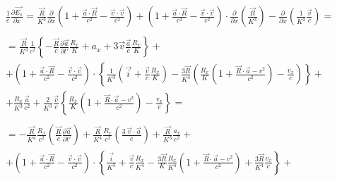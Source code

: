 \documentclass[11pt]{article}
\begin{document}
\[\begin{align}
  & \frac{1}{e}\frac{\partial \overrightarrow{{{E}_{1}}}}{\partial x}=\frac{\overrightarrow{R}}{{{K}^{3}}}\frac{\partial }{\partial x}\left( 1+\frac{\overrightarrow{a}\cdot \overrightarrow{R}}{{{c}^{2}}}-\frac{\overrightarrow{v}\cdot \overrightarrow{v}}{{{c}^{2}}} \right)+\left( 1+\frac{\overrightarrow{a}\cdot \overrightarrow{R}}{{{c}^{2}}}-\frac{\overrightarrow{v}\cdot \overrightarrow{v}}{{{c}^{2}}} \right)\cdot \frac{\partial }{\partial x}\left( \frac{\overrightarrow{R}}{{{K}^{3}}} \right)-\frac{\partial }{\partial x}\left( \frac{1}{{{K}^{2}}}\frac{\overrightarrow{v}}{c} \right)= \\ 
 &  \\ 
 & =\frac{\overrightarrow{R}}{{{K}^{3}}}\frac{1}{{{c}^{2}}}\left\{ -\frac{\overrightarrow{R}}{c}\frac{\partial \overrightarrow{a}}{\partial t'}\frac{{{R}_{x}}}{K}+{{a}_{x}}+3\overrightarrow{v}\frac{\overrightarrow{a}}{c}\frac{{{R}_{x}}}{K} \right\}+ \\ 
 & +\left( 1+\frac{\overrightarrow{a}\cdot \overrightarrow{R}}{{{c}^{2}}}-\frac{\overrightarrow{v}\cdot \overrightarrow{v}}{{{c}^{2}}} \right)\cdot \left\{ \frac{1}{{{K}^{3}}}\left( \overrightarrow{i}+\frac{\overrightarrow{v}}{c}\frac{{{R}_{x}}}{K} \right)-\frac{3\overrightarrow{R}}{{{K}^{4}}}\left( \frac{{{R}_{x}}}{K}\left( 1+\frac{\overrightarrow{R}\cdot \overrightarrow{a}-{{v}^{2}}}{{{c}^{2}}} \right)-\frac{{{v}_{x}}}{c} \right) \right\}+ \\ 
 & +\frac{{{R}_{x}}}{{{K}^{3}}}\frac{\overrightarrow{a}}{{{c}^{2}}}+\frac{2}{{{K}^{3}}}\frac{\overrightarrow{v}}{c}\left\{ \frac{{{R}_{x}}}{K}\left( 1+\frac{\overrightarrow{R}\cdot \overrightarrow{a}-{{v}^{2}}}{{{c}^{2}}} \right)-\frac{{{v}_{x}}}{c} \right\}= \\ 
 &  \\ 
 & =-\frac{\overrightarrow{R}}{{{K}^{4}}}\frac{{{R}_{x}}}{{{c}^{2}}}\left( \frac{\overrightarrow{R}}{c}\frac{\partial \overrightarrow{a}}{\partial t'} \right)+\frac{\overrightarrow{R}}{{{K}^{4}}}\frac{{{R}_{x}}}{{{c}^{2}}}\left( \frac{3\ \overrightarrow{v}\cdot \overrightarrow{a}}{c} \right)+\frac{\overrightarrow{R}}{{{K}^{3}}}\frac{{{a}_{x}}}{{{c}^{2}}}+ \\ 
 & +\left( 1+\frac{\overrightarrow{a}\cdot \overrightarrow{R}}{{{c}^{2}}}-\frac{\overrightarrow{v}\cdot \overrightarrow{v}}{{{c}^{2}}} \right)\cdot \left\{ \frac{\overrightarrow{i}}{{{K}^{3}}}+\frac{\overrightarrow{v}}{c}\frac{{{R}_{x}}}{{{K}^{4}}}-\frac{3\overrightarrow{R}}{K}\frac{{{R}_{x}}}{{{K}^{4}}}\left( 1+\frac{\overrightarrow{R}\cdot \overrightarrow{a}-{{v}^{2}}}{{{c}^{2}}} \right)+\frac{3\overrightarrow{R}}{{{K}^{4}}}\frac{{{v}_{x}}}{c} \right\}+ \\ 

\end{align}\]
\end{document}
